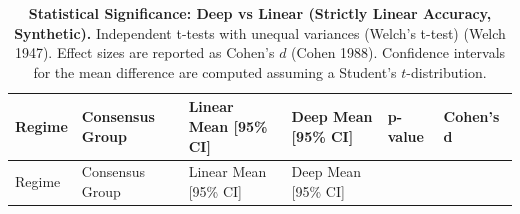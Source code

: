 \documentclass[
  letterpaper,
]{report}
\begin{document}
\begin{longtable}[]{@{}
  >{\raggedright\arraybackslash}p{}
  >{\raggedright\arraybackslash}p{}
  >{\raggedright\arraybackslash}p{}
  >{\raggedright\arraybackslash}p{}
  >{\raggedleft\arraybackslash}p{}
  >{\raggedleft\arraybackslash}p{}@{}}
\caption{\textbf{Statistical Significance: Deep vs Linear (Strictly
Linear Accuracy, Synthetic).} Independent t-tests with unequal variances
(Welch's t-test) (Welch 1947). Effect sizes are reported as Cohen's
\(d\) (Cohen 1988). Confidence intervals for the mean difference are
computed assuming a Student's
\(t\)-distribution.}\label{tbl-stat-sig-synthetic}\tabularnewline
\toprule\noalign{}
\begin{minipage}[b]{\linewidth}\raggedright
Regime
\end{minipage} & \begin{minipage}[b]{\linewidth}\raggedright
Consensus Group
\end{minipage} & \begin{minipage}[b]{\linewidth}\raggedright
Linear Mean {[}95\% CI{]}
\end{minipage} & \begin{minipage}[b]{\linewidth}\raggedright
Deep Mean {[}95\% CI{]}
\end{minipage} & \begin{minipage}[b]{\linewidth}\raggedleft
p-value
\end{minipage} & \begin{minipage}[b]{\linewidth}\raggedleft
Cohen's d
\end{minipage} \\
\midrule\noalign{}
\endfirsthead
\toprule\noalign{}
\begin{minipage}[b]{\linewidth}\raggedright
Regime
\end{minipage} & \begin{minipage}[b]{\linewidth}\raggedright
Consensus Group
\end{minipage} & \begin{minipage}[b]{\linewidth}\raggedright
Linear Mean {[}95\% CI{]}
\end{minipage} & \begin{minipage}[b]{\linewidth}\raggedright
Deep Mean {[}95\% CI{]}
\end{minipage} & \begin{minipage}[b]{\linewidth}\raggedleft

\end{minipage}
\end{longtable}
\end{document}
